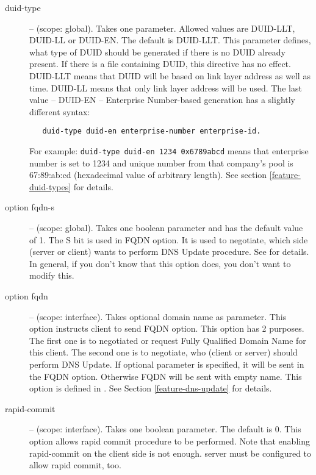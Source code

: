 \begin{description}



 \item[duid-type] -- (scope: global). Takes one parameter. Allowed
   values are DUID-LLT, DUID-LL or DUID-EN. The default is DUID-LLT.
   This parameter defines, what type of DUID should be generated if
   there is no DUID already present. If there is a file containing
   DUID, this directive has no effect. DUID-LLT means that DUID will
   be based on link layer address as well as time. DUID-LL means that
   only link layer address will be used. The last value -- DUID-EN --
   Enterprise Number-based generation has a slightly different syntax:
 \begin{lstlisting}
   duid-type duid-en enterprise-number enterprise-id.
\end{lstlisting}
   For example: \verb+duid-type duid-en 1234 0x6789abcd+ means that
   enterprise number is set to 1234 and unique number from that
   company's pool is 67:89:ab:cd (hexadecimal value of arbitrary
   length). See section \ref{feature-duid-types} for details.

\item[option fqdn-s] -- (scope: global). Takes one boolean parameter
  and has the default value of 1. The S bit is used in FQDN option. It
  is used to negotiate, which side (server or client) wants to perform
  DNS Update procedure. See \cite{rfc4704} for details. In general, if
  you don't know that this option does, you don't want to modify this.

\item[option fqdn] -- (scope: interface). Takes optional domain
   name as parameter. This option instructs client to send FQDN
   option. This option has 2 purposes. The first one is to negotiated
   or request Fully Qualified Domain Name for this client. The second
   one is to negotiate, who (client or server) should perform DNS
   Update. If optional parameter is specified, it will be sent in the
   FQDN option. Otherwise FQDN will be sent with empty name. This
   option is defined in \cite{rfc4704}. See
   Section \ref{feature-dns-update} for details.

 \item[rapid-commit] -- (scope: interface). Takes one boolean
   parameter. The default is 0. This option allows rapid commit
   procedure to be performed. Note that enabling rapid-commit on the
   client side is not enough. server must be configured to allow rapid
   commit, too.


\end{description}
